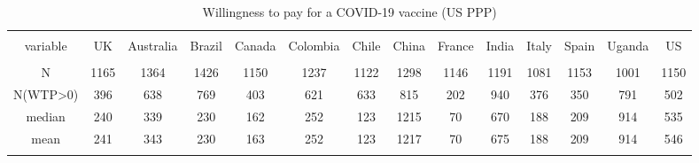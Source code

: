 
\begin{table}[!htbp] \centering 
  \caption{Willingness to pay for a COVID-19 vaccine (US PPP)} 
  \label{} 
\begin{tabular}{@{\extracolsep{5pt}} cccccccccccccc} 
\\[-1.8ex]\hline 
\hline \\[-1.8ex] 
variable & UK & Australia & Brazil & Canada & Colombia & Chile & China & France & India & Italy & Spain & Uganda & US \\ 
\hline \\[-1.8ex] 
N & 1165 & 1364 & 1426 & 1150 & 1237 & 1122 & 1298 & 1146 & 1191 & 1081 & 1153 & 1001 & 1150 \\ 
N(WTP\textgreater 0) & 396 & 638 & 769 & 403 & 621 & 633 & 815 & 202 & 940 & 376 & 350 & 791 & 502 \\ 
median & 240 & 339 & 230 & 162 & 252 & 123 & 1215 & 70 & 670 & 188 & 209 & 914 & 535 \\ 
mean & 241 & 343 & 230 & 163 & 252 & 123 & 1217 & 70 & 675 & 188 & 209 & 914 & 546 \\ 
\hline \\[-1.8ex] 
\end{tabular} 
\end{table} 
